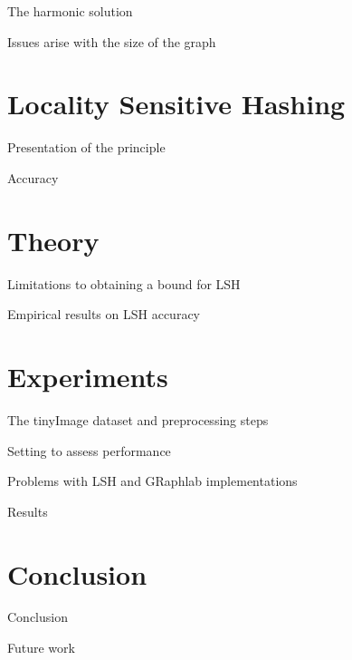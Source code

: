 \documentclass[11pt)]{beamer}
\begin{document}
\begin{frame}{The harmonic solution}
\end{frame}

\begin{frame}{Issues arise with the size of the graph}
\end{frame}

\section{Locality Sensitive Hashing}
\begin{frame}{Presentation of the principle}
\end{frame}

\begin{frame}{Accuracy}
\end{frame}

\section{Theory}
\begin{frame}{}
\end{frame}

\begin{frame}{Limitations to obtaining a bound for LSH}
\end{frame}

\begin{frame}{Empirical results on LSH accuracy}
\end{frame}

\section{Experiments}
\begin{frame}{The tinyImage dataset and preprocessing steps}
\end{frame}

\begin{frame}{Setting to assess performance}
\end{frame}

\begin{frame}{Problems with LSH and GRaphlab implementations}
\end{frame}

\begin{frame}{Results}
\end{frame}

\section{Conclusion}
\begin{frame}{Conclusion}
\end{frame}

\begin{frame}{Future work}
\end{frame}
\end{document}
